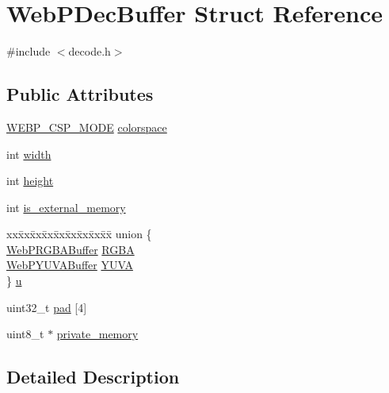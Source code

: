 \hypertarget{struct_web_p_dec_buffer}{}\section{Web\+P\+Dec\+Buffer Struct Reference}
\label{struct_web_p_dec_buffer}


{\ttfamily \#include $<$decode.\+h$>$}

\subsection*{Public Attributes}
\begin{DoxyCompactItemize}
\item 
\mbox{\hyperlink{decode_8h_aa2b2301594d9da5ecc3e8890ac023e79}{W\+E\+B\+P\+\_\+\+C\+S\+P\+\_\+\+M\+O\+DE}} \mbox{\hyperlink{struct_web_p_dec_buffer_aefebde52238f0298e98c4581caf09bdc}{colorspace}}
\item 
int \mbox{\hyperlink{struct_web_p_dec_buffer_ad60ebb8cce8580d92351c7aefd594e67}{width}}
\item 
int \mbox{\hyperlink{struct_web_p_dec_buffer_aa939892accab65f2b973554742163821}{height}}
\item 
int \mbox{\hyperlink{struct_web_p_dec_buffer_a635d2008c693ed5a8d09b855e08d89d0}{is\+\_\+external\+\_\+memory}}
\item 
\begin{tabbing}
xx\=xx\=xx\=xx\=xx\=xx\=xx\=xx\=xx\=\kill
union \{\\
\>\mbox{\hyperlink{struct_web_p_r_g_b_a_buffer}{WebPRGBABuffer}} \mbox{\hyperlink{struct_web_p_dec_buffer_a0cd31e68b50359e5211607af23c7b7bd}{RGBA}}\\
\>\mbox{\hyperlink{struct_web_p_y_u_v_a_buffer}{WebPYUVABuffer}} \mbox{\hyperlink{struct_web_p_dec_buffer_ac1d34dcf712341af78858ae5f5d16260}{YUVA}}\\
\} \mbox{\hyperlink{struct_web_p_dec_buffer_accaf4797c55b049a912bcad5514d0193}{u}}\\

\end{tabbing}\item 
uint32\+\_\+t \mbox{\hyperlink{struct_web_p_dec_buffer_a615322dcfbc7017966448b7cb99b09ac}{pad}} \mbox{[}4\mbox{]}
\item 
uint8\+\_\+t $\ast$ \mbox{\hyperlink{struct_web_p_dec_buffer_af4e2b7e48b272356f4856d2b33d5afc7}{private\+\_\+memory}}
\end{DoxyCompactItemize}


\subsection{Detailed Description}


